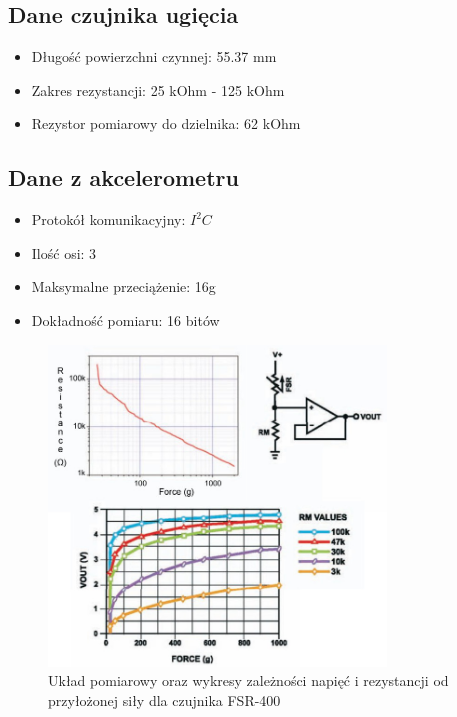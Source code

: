 \documentclass[12pt,a4paper]{article}
\begin{document}
\subsection{Dane czujnika ugięcia}
\begin{itemize}
\item Długość powierzchni czynnej: 55.37 mm
\item Zakres rezystancji: 25 kOhm - 125 kOhm
\item Rezystor pomiarowy do dzielnika: 62 kOhm
\end{itemize}
\subsection{Dane z akcelerometru}
\begin{itemize}
\item Protokół komunikacyjny: $I^2C$
\item Ilość osi: 3
\item Maksymalne przeciążenie: 16g
\item Dokładność pomiaru: 16 bitów 
\end{itemize}

\begin{figure}[h]
\centering
\includegraphics[width=0.8\textwidth]{images/fsr-400.jpg}
\caption{Układ pomiarowy oraz wykresy zależności napięć i rezystancji od przyłożonej siły dla czujnika FSR-400}
\label{fig:wykresy_fsr-400}
\end{figure}
\end{document}
